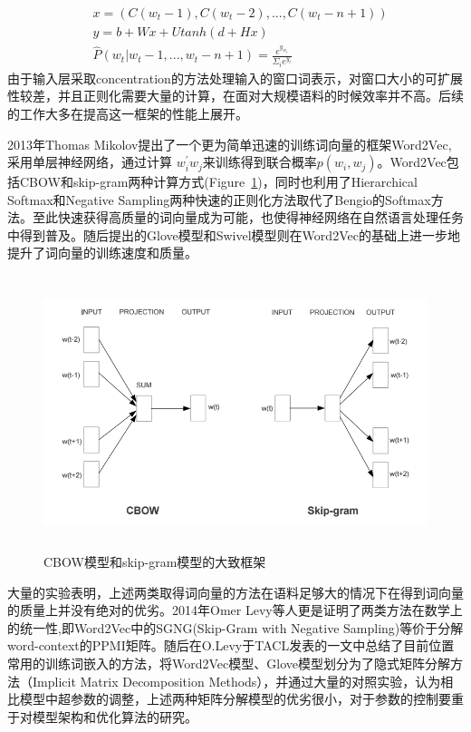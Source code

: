 \documentclass[a4paper,13pt]{article}
\begin{document}
\begin{spacing}{1.5}
\begin{align*}
&x=(C(w_t-1),C(w_t-2),...,C(w_t-n+1))\\
&y=b+Wx+Utanh(d+Hx)\\
&\hat{P}(w_t|w_t-1,...,w_t-n+1)=\frac{e^{y_{w_t}}}{\Sigma_{i}e^{y_i}}
\end{align*}
由于输入层采取concentration的方法处理输入的窗口词表示，对窗口大小的可扩展性较差，并且正则化需要大量的计算，在面对大规模语料的时候效率并不高。后续的工作大多在提高这一框架的性能上展开。

2013年Thomas Mikolov提出了一个更为简单迅速的训练词向量的框架Word2Vec\cite{mikolov2013efficient},采用单层神经网络，通过计算
$w_i^{\prime{}}w_j$来训练得到联合概率$p(w_i,w_j)$。Word2Vec包括CBOW和skip-gram两种计算方式(Figure\ \ref{fig:w2v})，同时也利用了Hierarchical Softmax和Negative Sampling两种快速的正则化方法取代了Bengio的Softmax方法。至此快速获得高质量的词向量成为可能，也使得神经网络在自然语言处理任务中得到普及。随后提出的Glove模型\cite{pennington2014glove}和Swivel模型\cite{shazeer2016swivel}则在Word2Vec的基础上进一步地提升了词向量的训练速度和质量。
\begin{figure}[h]
\includegraphics[width=\textwidth,height=8cm]{aaa.jpg}
\caption{\wuhao CBOW模型和skip-gram模型的大致框架}
\centering
\label{fig:w2v}
\end{figure}

大量的实验表明，上述两类取得词向量的方法在语料足够大的情况下在得到词向量的质量上并没有绝对的优劣。2014年Omer Levy等人更是证明了两类方法在数学上的统一性\cite{levy2014neural},即Word2Vec中的SGNG(Skip-Gram with Negative Sampling)等价于分解word-context的PPMI矩阵。随后在O.Levy于TACL发表的\cite{levy2015improving}一文中总结了目前位置常用的训练词嵌入的方法，将Word2Vec模型、Glove模型划分为了隐式矩阵分解方法（Implicit Matrix Decomposition Methods），并通过大量的对照实验，认为相比模型中超参数的调整，上述两种矩阵分解模型的优劣很小，对于参数的控制要重于对模型架构和优化算法的研究。


\end{spacing}
\end{document}
